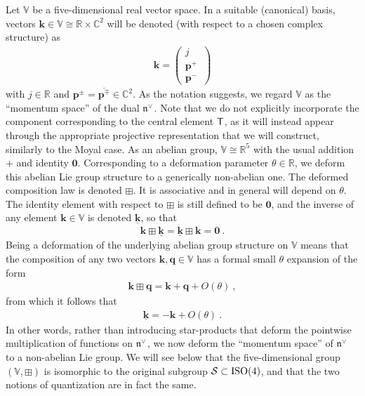 \documentclass[11pt,a4paper]{article}
\newcommand{\comp}{\boxplus}                            %
\newcommand{\1}{\mathbb{1}}
\newcommand{\mbf}[1]{{\boldsymbol {#1} }}
\def\T{{\sf T}}
\def\mk{{\mbf k}}
\def\mq{{\mbf q}}
\def\mbp{{\mbf p}}
\def\mfn{{\mathfrak n}}
\newcommand{\complex}{{\mathbb C}} %
\newcommand{\real}{{\mathbb R}} %
\newcommand{\beq}{\begin{eqnarray}}
\newcommand{\eeq}{\end{eqnarray}}
\begin{document}
Let $\mathbb{V}$ be a five-dimensional real vector space. In a
suitable (canonical) basis, vectors
$\mk\in\mathbb{V}\cong\real\times\complex^2$ will be denoted (with
respect to a chosen complex structure) as
\beq
\mk=\begin{pmatrix}j\\\mbp^+\,\\\mbp^-\end{pmatrix}
\label{Svectors}\eeq
with $j\in\real$ and $\mbp^\pm=\overline{\mbp^\mp}\in\complex^2$. As
the notation suggests, we
regard $\mathbb{V}$ as the ``momentum space'' of the dual
$\mfn^{\vee\,}$. Note that we do not explicitly incorporate the component
corresponding to the central element $\T$, as it will instead appear
through the appropriate projective representation that we will construct,
similarly to the Moyal case. As an abelian group,
$\mathbb{V}\cong\real^5$ with the usual addition $+$ and identity
$\mbf0$. Corresponding to a deformation parameter
$\theta\in\real$, we deform this abelian Lie group structure to a
generically non-abelian one. The deformed composition law is denoted
$\comp$. It is associative and in general will depend on
$\theta$. The identity element with respect to $\comp$ is still
defined to be $\mbf0$, and the inverse of any element $\mk\in\mathbb{V}$
is denoted $\underline{\mk}$, so that
\beq
\mk\comp\underline{\mk}=\underline{\mk}\comp\mk=\mbf0 \ .
\label{compinverse}\eeq
Being a deformation of the underlying abelian group structure on
$\mathbb{V}$ means that the composition of any two vectors
$\mk,\mq\in\mathbb{V}$ has a formal small $\theta$ expansion of the
form
\beq
\mk\comp\mq=\mk+\mq+O(\theta) \ ,
\label{compsmalltheta}\eeq
from which it follows that
\beq
\underline{\mk}=-\mk+O(\theta) \ .
\label{compinvsmalltheta}\eeq
In other words, rather than introducing star-products that deform the
pointwise multiplication of functions on $\mfn^{\vee\,}$, we now deform the
``momentum space'' of $\mfn^{\vee\,}$ to a non-abelian Lie group.
We will see below that the five-dimensional group
$(\mathbb{V},\comp)$ is isomorphic to the original subgroup
$\mathcal{S}\subset{\rm ISO}(4)$, and that the two notions of
quantization are in fact the same.
\end{document}
